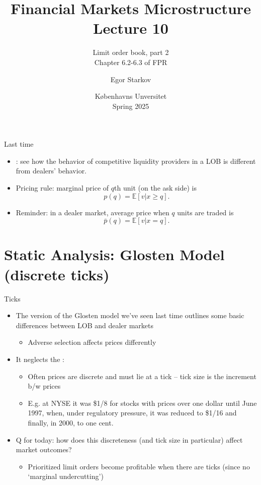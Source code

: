 \documentclass[english,10pt
,aspectratio=169
]{beamer}
\title{Financial Markets Microstructure \\ Lecture 10}
\subtitle{Limit order book, part 2\\
	Chapter 6.2-6.3 of FPR}
\author{Egor Starkov}
\date{K{\o}benhavns Unversitet \\
	Spring 2025}
\begin{document}
\frame[plain]{\titlepage}


\begin{frame}{Last time}
	\begin{itemize}
		\item {}: see how the behavior of competitive liquidity providers in a LOB is different from dealers' behavior.
		\item Pricing rule: \alert{marginal price} of $q$th unit (on the ask side) is $$p(q) = \mathbb{E} [v | x \geq q].$$
		\item Reminder: in a dealer market, average price when $q$ units are traded is $$\bar{p}(q) = \mathbb{E} [v | x = q].$$
	\end{itemize}
\end{frame}


\section{Static Analysis: Glosten Model (discrete ticks)}

\begin{frame}{Ticks}
	\begin{itemize}
		\item The version of the Glosten model we've seen last time outlines some basic differences between LOB and dealer markets
		\begin{itemize}
			\item Adverse selection affects prices differently
		\end{itemize}
		\item It neglects the :
		\begin{itemize}
			\item Often prices are discrete and must lie at a tick --  tick size is the increment b/w prices
			\item E.g. at NYSE it was \$1/8 for stocks with prices over one dollar until June 1997, when, under regulatory pressure, it was reduced to \$1/16 and finally, in 2000, to one cent.
		\end{itemize}
		\item Q for today: how does this discreteness (and tick size in particular) affect market outcomes?
		\begin{itemize}
			\item Prioritized limit orders become profitable when there are ticks (since no `marginal undercutting')
		\end{itemize}
	\end{itemize}
\end{frame}
\end{document}
